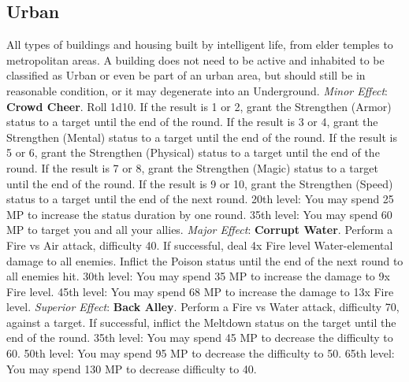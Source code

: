 \begin{multicols}{2}
\subsection{Urban}
\label{subsec:geo-urban}
All types of buildings and housing built by intelligent life, from elder temples to metropolitan areas. A building does not need to be active and inhabited to be classified as Urban or even be part of an urban area, but should still be in reasonable condition, or it may degenerate into an Underground.
\textit{Minor Effect}: \textbf{Crowd Cheer}. Roll 1d10. If the result is 1 or 2, grant the Strengthen (Armor) status to a target until the end of the round. If the result is 3 or 4, grant the Strengthen (Mental) status to a target until the end of the round. If the result is 5 or 6, grant the Strengthen (Physical) status to a target until the end of the round. If the result is 7 or 8, grant the Strengthen (Magic) status to a target until the end of the round. If the result is 9 or 10, grant the Strengthen (Speed) status to a target until the end of the next round. 20th level: You may spend 25 MP to increase the status duration by one round. 35th level: You may spend 60 MP to target you and all your allies.
\textit{Major Effect}: \textbf{Corrupt Water}. Perform a Fire vs Air attack, difficulty 40. If successful, deal 4x Fire level Water-elemental damage to all enemies. Inflict the Poison status until the end of the next round to all enemies hit. 30th level: You may spend 35 MP to increase the damage to 9x Fire level. 45th level: You may spend 68 MP to increase the damage to 13x Fire level.
\textit{Superior Effect}: \textbf{Back Alley}. Perform a Fire vs Water attack, difficulty 70, against a target. If successful, inflict the Meltdown status on the target until the end of the round. 35th level: You may spend 45 MP to decrease the difficulty to 60. 50th level: You may spend 95 MP to decrease the difficulty to 50. 65th level: You may spend 130 MP to decrease difficulty to 40.


\end{multicols}
